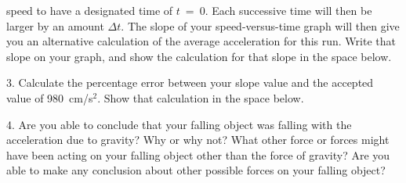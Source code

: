 speed to have a designated time of $t$~=~0.  Each
successive time will then be larger by an amount 
$\Delta t$.  The slope of your speed-versus-time graph
will then give you an alternative calculation of the
average acceleration for this run.  Write that slope
on your graph, and show the calculation for that slope 
in the space below.
\item{3.} Calculate the percentage error between your
slope value and the accepted value of 980~cm/s$^2$.
Show that calculation in the space below.
\item{4.} Are you able to conclude that your falling
object was falling with the acceleration due to gravity?
Why or why not?  What other force or forces might have 
been acting on your falling object other than the force
of gravity?  Are you able to make any conclusion about
other possible forces on your falling object?
\vfil\eject
